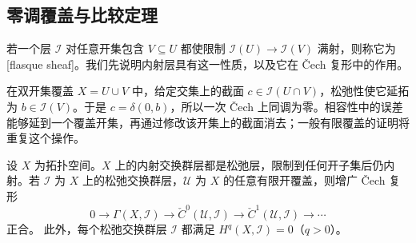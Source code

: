 \subsection{零调覆盖与比较定理}
\label{b4:subsec:C03:03}

若一个层 \(\mathcal I\) 对任意开集包含 \(V\subseteq U\) 都使限制 \(\mathcal I(U)\rightarrow\mathcal I(V)\) 满射，则称它为[flasque sheaf]。我们先说明内射层具有这一性质，以及它在 Čech 复形中的作用。

\ProseParagraphBreak
在双开集覆盖 \(X=U\cup V\) 中，给定交集上的截面 \(c\in\mathcal I(U\cap V)\)，松弛性使它延拓为 \(b\in\mathcal I(V)\)。于是 \(c=\delta(0,b)\)，所以一次 Čech 上同调为零。相容性中的误差能够延到一个覆盖开集，再通过修改该开集上的截面消去；一般有限覆盖的证明将重复这个操作。

\begin{lemma}\label{b4:lem:C-flasque-cech}
	设 \(X\) 为拓扑空间。\(X\) 上的内射交换群层都是松弛层，限制到任何开子集后仍内射。若 \(\mathcal I\) 为 \(X\) 上的松弛交换群层，\(\mathcal U\) 为 \(X\) 的任意有限开覆盖，则增广 Čech 复形
	\[
		0\longrightarrow\Gamma(X,\mathcal I) \longrightarrow\check C^0(\mathcal U,\mathcal I) \longrightarrow\check C^1(\mathcal U,\mathcal I)\longrightarrow\cdots
	\]
	正合。 此外，每个松弛交换群层 \(\mathcal I\) 都满足 \(H^q(X,\mathcal I)=0\)（\(q>0\)）。
\end{lemma}
